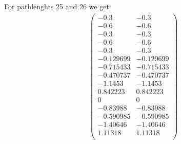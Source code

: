 For pathlenghts 25 and 26 we get:
{\small
\begin{gather*}\left(
\begin{array}{cc}
 -0.3 & -0.3 \\
 -0.6 & -0.6 \\
 -0.3 & -0.3 \\
 -0.6 & -0.6 \\
 -0.3 & -0.3 \\
 -0.129699 & -0.129699 \\
 -0.715433 & -0.715433 \\
 -0.470737 & -0.470737 \\
 -1.1453 & -1.1453 \\
 0.842223 & 0.842223 \\
 0 & 0 \\
 -0.83988 & -0.83988 \\
 -0.590985 & -0.590985 \\
 -1.40646 & -1.40646 \\
 1.11318 & 1.11318 \\
\end{array}
\right)
\end{gather*}
}
